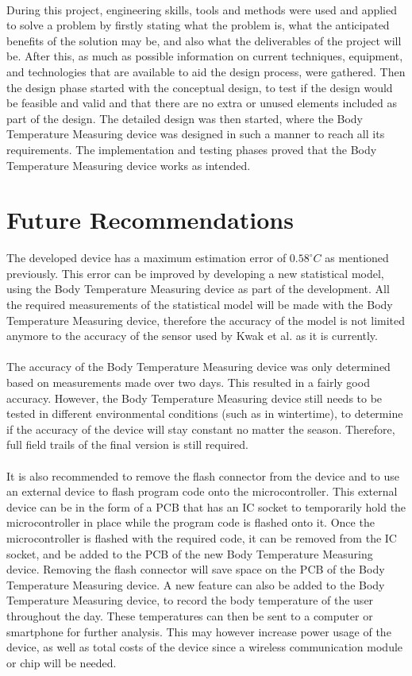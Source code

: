 \\
During this project, engineering skills, tools and methods were used and applied to solve a problem by firstly stating what the problem is, what the anticipated benefits of the solution may be, and also what the deliverables of the project will be. After this, as much as possible information on current techniques, equipment, and technologies that are available to aid the design process, were gathered. Then the design phase started with the conceptual design, to test if the design would be feasible and valid and that there are no extra or unused elements included as part of the design. The detailed design was then started, where the Body Temperature Measuring device was designed in such a manner to reach all its requirements. The implementation and testing phases proved that the Body Temperature Measuring device works as intended.

\section{Future Recommendations}
The developed device has a maximum estimation error of $ 0.58^{\circ} C $ as mentioned previously. This error can be improved by developing a new statistical model, using the Body Temperature Measuring device as part of the development. All the required measurements of the statistical model will be made with the Body Temperature Measuring device, therefore the accuracy of the model is not limited anymore to the accuracy of the sensor used by Kwak et al. \cite{Kwak2019} as it is currently. 
\\
\\
The accuracy of the Body Temperature Measuring device was only determined based on measurements made over two days. This resulted in a fairly good accuracy. However, the Body Temperature Measuring device still needs to be tested in different environmental conditions (such as in wintertime), to determine if the accuracy of the device will stay constant no matter the season. Therefore, full field trails of the final version is still required.
\\
\\
It is also recommended to remove the flash connector from the device and to use an external device to flash program code onto the microcontroller. This external device can be in the form of a PCB that has an IC socket to temporarily hold the microcontroller in place while the program code is flashed onto it. Once the microcontroller is flashed with the required code, it can be removed from the IC socket, and be added to the PCB of the new Body Temperature Measuring device. Removing the flash connector will save space on the PCB of the Body Temperature Measuring device. A new feature can also be added to the Body Temperature Measuring device, to record the body temperature of the user throughout the day. These temperatures can then be sent to a computer or smartphone for further analysis. This may however increase power usage of the device, as well as total costs of the device since a wireless communication module or chip will be needed.

